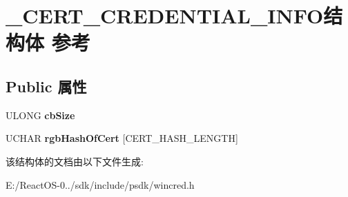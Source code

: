 \hypertarget{struct___c_e_r_t___c_r_e_d_e_n_t_i_a_l___i_n_f_o}{}\section{\+\_\+\+C\+E\+R\+T\+\_\+\+C\+R\+E\+D\+E\+N\+T\+I\+A\+L\+\_\+\+I\+N\+F\+O结构体 参考}
\label{struct___c_e_r_t___c_r_e_d_e_n_t_i_a_l___i_n_f_o}
\subsection*{Public 属性}
\begin{DoxyCompactItemize}
\item 
\mbox{\label{struct___c_e_r_t___c_r_e_d_e_n_t_i_a_l___i_n_f_o_ac3992495bd2df491011b62136a6451f2}} 
U\+L\+O\+NG {\bfseries cb\+Size}
\item 
\mbox{\label{struct___c_e_r_t___c_r_e_d_e_n_t_i_a_l___i_n_f_o_a1867173068834fce546eb33b9d24fc94}} 
U\+C\+H\+AR {\bfseries rgb\+Hash\+Of\+Cert} \mbox{[}C\+E\+R\+T\+\_\+\+H\+A\+S\+H\+\_\+\+L\+E\+N\+G\+TH\mbox{]}
\end{DoxyCompactItemize}


该结构体的文档由以下文件生成\+:\begin{DoxyCompactItemize}
\item 
E\+:/\+React\+O\+S-\/0../sdk/include/psdk/wincred.\+h\end{DoxyCompactItemize}
